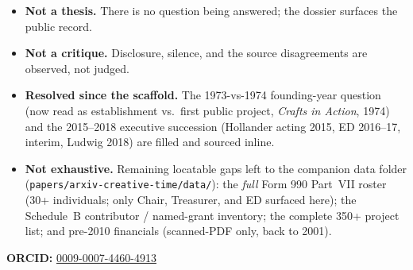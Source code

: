 \documentclass[10pt,letterpaper,twocolumn]{article}
\begin{document}
\begin{itemize}
\item \textbf{Not a thesis.} There is no question being answered; the dossier surfaces the public record.
\item \textbf{Not a critique.} Disclosure, silence, and the source disagreements are observed, not judged.
\item \textbf{Resolved since the scaffold.} The 1973-vs-1974 founding-year question (now read as establishment vs.\ first public project, \emph{Crafts in Action}, 1974) and the 2015--2018 executive succession (Hollander acting 2015, ED 2016--17, interim, Ludwig 2018) are filled and sourced inline.
\item \textbf{Not exhaustive.} Remaining locatable gaps left to the companion data folder (\texttt{papers/arxiv-creative-time/data/}): the \emph{full} Form 990 Part~VII roster (30+ individuals; only Chair, Treasurer, and ED surfaced here); the Schedule~B contributor / named-grant inventory; the complete 350+ project list; and pre-2010 financials (scanned-PDF only, back to 2001).
\end{itemize}

\vspace{0.5em}
\noindent\textbf{ORCID:} \href{https://orcid.org/0009-0007-4460-4913}{0009-0007-4460-4913}



\end{document}
